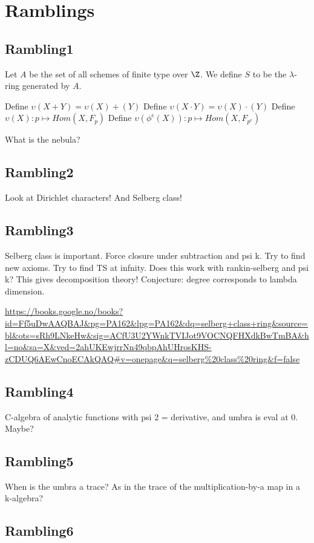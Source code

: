 
\section{Ramblings}

\subsection{Rambling1}

Let $A$ be the set of all schemes of finite type over $\Z$. We define $S$ to be the $\lambda$-ring generated by $A$. 

Define $\upsilon(X + Y) = \upsilon(X) + (Y)$
Define $\upsilon(X \cdot Y) = \upsilon(X) \cdot (Y)$
Define $\upsilon(X) : p \mapsto Hom(X, F_p)$
Define $\upsilon(\phi^e(X)) : p \mapsto Hom(X, F_{p^e})$

What is the nebula?


\subsection{Rambling2}

Look at Dirichlet characters! And Selberg class!

\subsection{Rambling3}

Selberg class is important. Force closure under subtraction and psi k. Try to find new axioms. Try to find TS at infnity. Does this work with rankin-selberg and psi k? This gives decomposition theory! Conjecture: degree corresponds to lambda dimension.

\url{https://books.google.no/books?id=Ff5uDwAAQBAJ&pg=PA162&lpg=PA162&dq=selberg+class+ring&source=bl&ots=sRh9LNkeHw&sig=ACfU3U2YWnkTVIJot9VOCNQFHXdkBwTmBA&hl=no&sa=X&ved=2ahUKEwjrrNn49qbpAhUHrosKHS-zCDUQ6AEwCnoECAkQAQ#v=onepage&q=selberg%20class%20ring&f=false}


\subsection{Rambling4}

C-algebra of analytic functions with psi 2 = derivative, and umbra is eval at 0. Maybe?


\subsection{Rambling5}

When is the umbra a trace? As in the trace of the multiplication-by-a map in a k-algebra?

\subsection{Rambling6}



